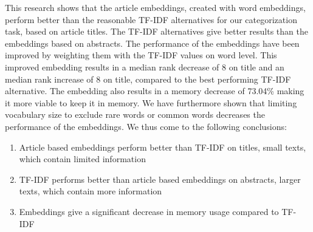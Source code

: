 \documentclass[../../Thesis.tex]{subfiles}
\begin{document}
This research shows that the article embeddings, created with word embeddings, perform better than the reasonable TF-IDF alternatives for our categorization task, based on article titles. The TF-IDF alternatives give better results than the embeddings based on abstracts. The performance of the embeddings have been improved by weighting them with the TF-IDF values on word level. This improved embedding results in a median rank decrease of 8 on title and an median rank increase of 8 on title, compared to the best performing TF-IDF alternative.  The embedding also results in a memory decrease of 73.04\% making it more viable to keep it in memory.
We have furthermore shown that limiting vocabulary size to exclude rare words or common words decreases the performance of the embeddings. We thus come to the following conclusions:
\begin{enumerate}
\item{Article based embeddings perform better than TF-IDF on titles, small texts, which contain limited information}
\item{TF-IDF performs better than article based embeddings on abstracts, larger texts, which contain more information}
\item{Embeddings give a significant decrease in memory usage compared to TF-IDF}
\end{enumerate}
\end{document}
